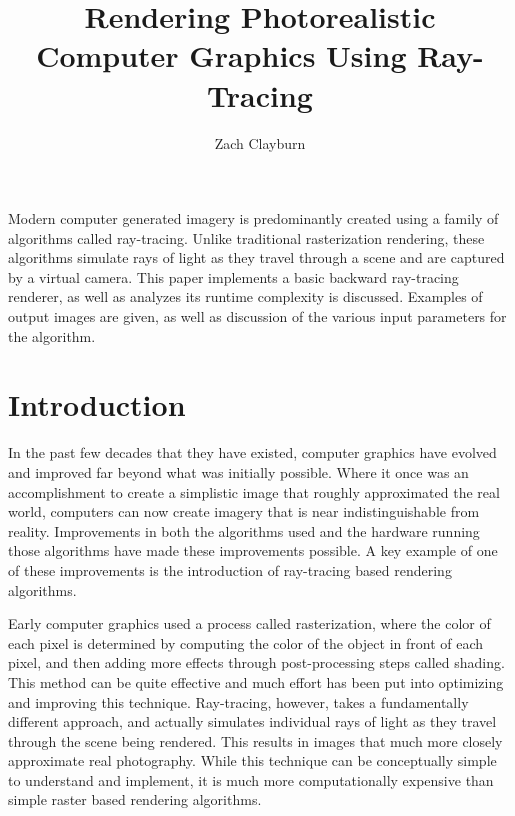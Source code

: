 \documentclass[10pt]{IEEEtran}
\title{Rendering Photorealistic Computer Graphics Using Ray-Tracing}
\author{Zach Clayburn}
\renewenvironment{abstract}{
    \small
    \begin{center}
    \bfseries \abstractname\vspace{-.5em}\vspace{0pt}
    \end{center}
    \list{}{%
        \setlength{\leftmargin}{4mm}
        \setlength{\rightmargin}{\leftmargin}
    }
    \item\relax
}{\endlist}
\begin{document}
\maketitle


\begin{abstract}

Modern computer generated imagery is predominantly created using a family of algorithms called
ray-tracing. Unlike traditional rasterization rendering, these algorithms simulate rays of light as
they travel through a scene and are captured by a virtual camera. This paper implements a basic
backward ray-tracing renderer, as well as analyzes its runtime complexity is discussed. Examples of
output images are given, as well as discussion of the various input parameters for the algorithm.

\end{abstract}

\section*{Introduction}

In the past few decades that they have existed, computer graphics have evolved and improved far
beyond what was initially possible. Where it once was an accomplishment to create a simplistic image
that roughly approximated the real world, computers can now create imagery that is near
indistinguishable from reality. Improvements in both the algorithms used and the hardware running
those algorithms have made these improvements possible. A key example of one of these improvements
is the introduction of ray-tracing based rendering algorithms.

Early computer graphics used a process called rasterization, where the color of each pixel is
determined by computing the color of the object in front of each pixel, and then adding more effects
through post-processing steps called shading. This method can be quite effective and much effort has
been put into optimizing and improving this technique. Ray-tracing, however, takes a fundamentally
different approach, and actually simulates individual rays of light as they travel through the scene
being rendered. This results in images that much more closely approximate real photography. While
this technique can be conceptually simple to understand and implement, it is much more
computationally expensive than simple raster based rendering algorithms.
\end{document}

